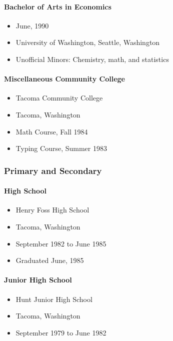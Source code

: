 \documentclass[12pt]{article}
\begin{document}
\paragraph{Bachelor of Arts in Economics}

\begin{itemize}

\item
  June, 1990
\item
  University of Washington, Seattle, Washington
\item
  Unofficial Minors: Chemistry, math, and statistics
\end{itemize}

\paragraph {Miscellaneous Community College}
\begin{itemize}
\item Tacoma Community College
\item Tacoma, Washington
\item Math Course, Fall 1984
\item Typing Course, Summer 1983
\end{itemize}

\subsubsection{Primary and Secondary}

\paragraph {High School}
\begin{itemize}
\item Henry Foss High School
\item Tacoma, Washington
\item September 1982 to June 1985
\item Graduated June, 1985
\end{itemize}

\paragraph {Junior High School}  
\begin{itemize}
\item Hunt Junior High School
\item Tacoma, Washington
\item September 1979 to June 1982
\end{itemize}
\end{document}
